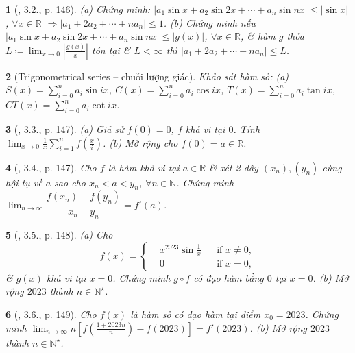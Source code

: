 \documentclass{article}
\newtheorem{baitoan}{}
\begin{document}
\begin{baitoan}[\cite{Quoc_Long_Dat_Nam_VMC}, 3.2., p. 146]
	(a) Chứng minh: $|a_1\sin x + a_2\sin2x + \cdots + a_n\sin nx|\le|\sin x|$, $\forall x\in\mathbb{R}$ $\Rightarrow|a_1 + 2a_2 + \cdots + na_n|\le1$. (b) Chứng minh nếu $|a_1\sin x + a_2\sin2x + \cdots + a_n\sin nx|\le|g(x)|$, $\forall x\in\mathbb{R}$, \& hàm $g$ thỏa $L\coloneqq\lim_{x\to0} \left|\frac{g(x)}{x}\right|$ tồn tại \& $L < \infty$ thì $|a_1 + 2a_2 + \cdots + na_n|\le L$.
\end{baitoan}

\begin{baitoan}[Trigonometrical series -- chuỗi lượng giác]
	Khảo sát hàm số: (a) $S(x) = \sum_{i=0}^n a_i\sin ix$, $C(x) = \sum_{i=0}^n a_i\cos ix$, $T(x) = \sum_{i=0}^n a_i\tan ix$, $CT(x) = \sum_{i=0}^n a_i\cot ix$.
\end{baitoan}

\begin{baitoan}[\cite{Quoc_Long_Dat_Nam_VMC}, 3.3., p. 147]
	(a) Giả sử $f(0) = 0$, $f$ khả vi tại $0$. Tính $\lim_{x\to0} \frac{1}{x}\sum_{i=1}^n f\left(\frac{x}{i}\right)$. (b) Mở rộng cho $f(0) = a\in\mathbb{R}$.
\end{baitoan}

\begin{baitoan}[\cite{Quoc_Long_Dat_Nam_VMC}, 3.4., p. 147]
	Cho $f$ là hàm khả vi tại $a\in\mathbb{R}$ \& xét 2 dãy $(x_n),(y_n)$ cùng hội tụ về $a$ sao cho $x_n < a < y_n$, $\forall n\in\mathbb{N}$. Chứng minh $\lim_{n\to\infty} \dfrac{f(x_n) - f(y_n)}{x_n - y_n} = f'(a)$.
\end{baitoan}

\begin{baitoan}[\cite{Quoc_Long_Dat_Nam_VMC}, 3.5., p. 148]
	(a) Cho
	\begin{equation*}
		f(x) = \left\{\begin{split}
			&x^{2023}\sin\frac{1}{x}&&\mbox{if } x\ne0,\\
			&0&&\mbox{if } x = 0,
		\end{split}\right.
	\end{equation*}
	\& $g(x)$ khả vi tại $x = 0$. Chứng minh $g\circ f$ có đạo hàm bằng $0$ tại $x = 0$. (b) Mở rộng $2023$ thành $n\in\mathbb{N}^\star$.
\end{baitoan}

\begin{baitoan}[\cite{Quoc_Long_Dat_Nam_VMC}, 3.6., p. 149]
	Cho $f(x)$ là hàm số có đạo hàm tại điểm $x_0 = 2023$. Chứng minh $\lim_{n\to\infty} n\left[f\left(\frac{1 + 2023n}{n}\right) - f(2023)\right] = f'(2023)$. (b) Mở rộng $2023$ thành $n\in\mathbb{N}^\star$.
\end{baitoan}
\end{document}
